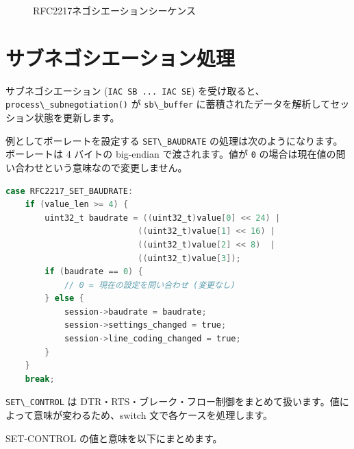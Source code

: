 \documentclass[10pt,twoside,openany,a4j]{ltjsbook}
\newcommand{\passthrough}[1]{#1}
\newcommand{\pandocbounded}[1]{#1}
\begin{document}
\begin{figure}
\centering
\pandocbounded{}
\caption{RFC2217ネゴシエーションシーケンス}\label{fig:rfc2217_negotiation}
\end{figure}

\section{サブネゴシエーション処理}\label{ux30b5ux30d6ux30cdux30b4ux30b7ux30a8ux30fcux30b7ux30e7ux30f3ux51e6ux7406}

サブネゴシエーション (\passthrough{\lstinline!IAC SB ... IAC SE!})
を受け取ると、\passthrough{\lstinline!process\_subnegotiation()!} が
\passthrough{\lstinline!sb\_buffer!}
に蓄積されたデータを解析してセッション状態を更新します。

例としてボーレートを設定する \passthrough{\lstinline!SET\_BAUDRATE!}
の処理は次のようになります。 ボーレートは 4 バイトの big-endian
で渡されます。値が \passthrough{\lstinline!0!}
の場合は現在値の問い合わせという意味なので変更しません。

\begin{lstlisting}[language=C]
case RFC2217_SET_BAUDRATE:
    if (value_len >= 4) {
        uint32_t baudrate = ((uint32_t)value[0] << 24) |
                           ((uint32_t)value[1] << 16) |
                           ((uint32_t)value[2] << 8)  |
                           ((uint32_t)value[3]);
        if (baudrate == 0) {
            // 0 = 現在の設定を問い合わせ (変更なし)
        } else {
            session->baudrate = baudrate;
            session->settings_changed = true;
            session->line_coding_changed = true;
        }
    }
    break;
\end{lstlisting}

\passthrough{\lstinline!SET\_CONTROL!} は
DTR・RTS・ブレーク・フロー制御をまとめて扱います。値によって意味が変わるため、switch
文で各ケースを処理します。

SET-CONTROL の値と意味を以下にまとめます。
\end{document}
